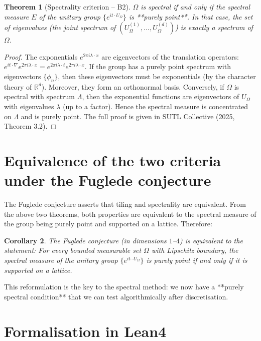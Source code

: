 \documentclass[11pt,a4paper]{article}
\newtheorem{theorem}{Theorem}[section]
\newtheorem{corollary}[theorem]{Corollary}
\begin{document}
\begin{theorem}[Spectrality criterion – B2]
$\Omega$ is spectral if and only if the spectral measure $E$ of the unitary group $\{e^{i t \cdot U_\Omega}\}$ is **purely point**. In that case, the set of eigenvalues (the joint spectrum of $(U_\Omega^{(1)},\dots,U_\Omega^{(d)})$) is exactly a spectrum of $\Omega$.
\end{theorem}
\begin{proof}
The exponentials $e^{2\pi i \lambda \cdot x}$ are eigenvectors of the translation operators: $e^{i t \cdot \nabla} e^{2\pi i \lambda \cdot x} = e^{2\pi i \lambda \cdot t} e^{2\pi i \lambda \cdot x}$. If the group has a purely point spectrum with eigenvectors $\{\phi_n\}$, then these eigenvectors must be exponentials (by the character theory of $\mathbb{R}^d$). Moreover, they form an orthonormal basis. Conversely, if $\Omega$ is spectral with spectrum $\Lambda$, then the exponential functions are eigenvectors of $U_\Omega$ with eigenvalues $\lambda$ (up to a factor). Hence the spectral measure is concentrated on $\Lambda$ and is purely point. The full proof is given in SUTL Collective (2025, Theorem 3.2).
\end{proof}

\section{Equivalence of the two criteria under the Fuglede conjecture}

The Fuglede conjecture asserts that tiling and spectrality are equivalent. From the above two theorems, both properties are equivalent to the spectral measure of the group being purely point and supported on a lattice. Therefore:

\begin{corollary}
The Fuglede conjecture (in dimensions $1$–$4$) is equivalent to the statement: For every bounded measurable set $\Omega$ with Lipschitz boundary, the spectral measure of the unitary group $\{e^{i t \cdot U_\Omega}\}$ is purely point if and only if it is supported on a lattice.
\end{corollary}

This reformulation is the key to the spectral method: we now have a **purely spectral condition** that we can test algorithmically after discretisation.

\section{Formalisation in Lean4}
\end{document}
